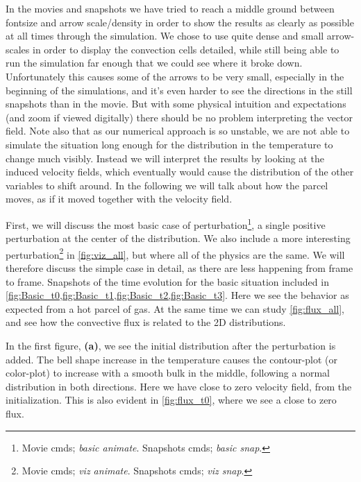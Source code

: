 \documentclass[11pt,a4paper,twocolumn,titlepage]{article}
\begin{document}
In the movies and snapshots we have tried to reach a middle ground between fontsize and arrow scale/density in order to show the results as clearly as possible at all times through the simulation. We chose to use quite dense and small arrow-scales in order to display the convection cells detailed, while still being able to run the simulation far enough that we could see where it broke down. Unfortunately this causes some of the arrows to be very small, especially in the beginning of the simulations, and it's even harder to see the directions in the still snapshots than in the movie. But with some physical intuition and expectations (and zoom if viewed digitally) there should be no problem interpreting the vector field. Note also that as our numerical approach is so unstable, we are not able to simulate the situation long enough for the distribution in the temperature to change much visibly. Instead we will interpret the results by looking at the induced velocity fields, which eventually would cause the distribution of the other variables to shift around. In the following we will talk about how the parcel moves, as if it moved together with the velocity field.

First, we will discuss the most basic case of perturbation\footnote{Movie cmds; \textit{basic animate}. Snapshots cmds; \textit{basic snap}.}, a single positive perturbation at the center of the distribution. We also include a more interesting perturbation\footnote{Movie cmds; \textit{viz animate}. Snapshots cmds; \textit{viz snap}.} in \cref{fig:viz_all}, but where all of the physics are the same. We will therefore discuss the simple case in detail, as there are less happening from frame to frame. Snapshots of the time evolution for the basic situation included in \cref{fig:Basic_t0,fig:Basic_t1,fig:Basic_t2,fig:Basic_t3}. Here we see the behavior as expected from a hot parcel of gas. At the same time we can study \cref{fig:flux_all}, and see how the convective flux is related to the 2D distributions.

In the first figure, \textbf{(a)}, we see the initial distribution after the perturbation is added. The bell shape increase in the temperature causes the contour-plot (or color-plot) to increase with a smooth bulk in the middle, following a normal distribution in both directions. Here we have close to zero velocity field, from the initialization. This is also evident in \cref{fig:flux_t0}, where we see a close to zero flux.
\end{document}
